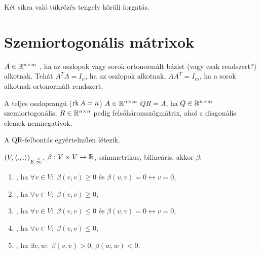 \begin{kov}
	Két síkra való tükrözés tengely körüli forgatás.
\end{kov}


\section{Szemiortogonális mátrixok}
\begin{ff}
	$A\in\mathbb{R}^{n\times m}$ , ha az oszlopok vagy sorok ortonormált
	bázist (vagy csak rendszert?) alkotnak. Tehát $A^TA=I_n$, ha az oszlopok
	alkotnak, $AA^T=I_m$, ha a sorok alkotnak ortonormált rendszert.
\end{ff}
\begin{ff}
	A teljes oszloprangú ($\operatorname{rk}{A}=n$) $A\in\mathbb{R}^{n\times m}$  $QR=A$, ha
	$Q\in\mathbb{R}^{n\times m}$ szemiortogonális, $R\in\mathbb{R}^{n\times n}$ pedig felsőháromszögmátrix, ahol a
	diagonális elemek nemnegatívok.
\end{ff}
\begin{tet}
	A QR-felbontás egyértelműen létezik.
\end{tet}
\begin{ff}
	$(V,\langle.,.\rangle)_{E,\overset{<}{\infty}}$, $\beta:V\times V\to \mathbb{R}$, szimmetrikus, bilineáris, akkor
$\beta:$	
	\begin{enumerate}
		\item {}, ha $\forall v\in V:$ $\beta(v,v)\ge 0$ és
			$\beta(v,v)=0\leftrightarrow v=0$,
		\item {}, ha $\forall v\in V:$ $\beta(v,v)\ge 0$,
		\item {}, ha $\forall v\in V:$ $\beta(v,v)\leq 0$ és
			$\beta(v,v)=0\leftrightarrow v=0$,
		\item {}, ha $\forall v\in V:$ $\beta(v,v)\leq 0$,
		\item {}, ha $\exists v,w:$ $\beta(v,v)>0$, $\beta(w,w)<0$.
	\end{enumerate}
\end{ff}


